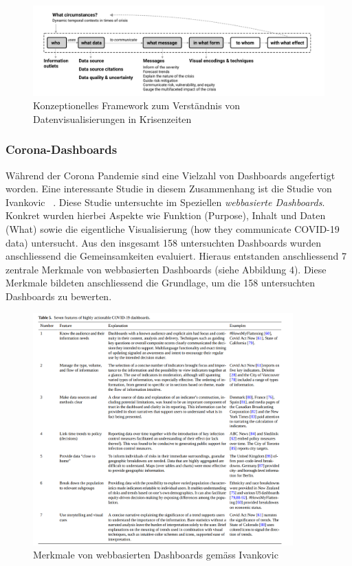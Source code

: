 \documentclass[12pt, oneside]{article}
\begin{document}
 \begin{figure}[ht]
    \includegraphics[width=12cm]{images/zhang_conceptual_framework.png}
    \centering
    \caption{Konzeptionelles Framework zum Verständnis von Datenvisualisierungen in Krisenzeiten ~\citep[S. 4]{YixuanZhang.}}
\end{figure}
 
\subsubsection{Corona-Dashboards}
Während der Corona Pandemie sind eine Vielzahl von Dashboards angefertigt worden. Eine interessante Studie in diesem Zusammenhang ist die Studie von Ivankovic ~\citep{Ivankovic.2021}. Diese Studie untersuchte im Speziellen \textit{webbasierte Dashboards}. Konkret wurden hierbei Aspekte wie Funktion (Purpose), Inhalt und Daten (What) sowie die eigentliche Visualisierung (how they communicate COVID-19 data) untersucht. Aus den insgesamt 158 untersuchten Dashboards wurden anschliessend die Gemeinsamkeiten evaluiert. Hieraus entstanden anschliessend 7 zentrale Merkmale von webbasierten Dashboards (siehe Abbildung 4). Diese Merkmale bildeten anschliessend die Grundlage, um die 158 untersuchten Dashboards zu bewerten.
\clearpage

 \begin{figure}[ht]
    \includegraphics[width=10cm]{images/ivankovic_dashboard_characteristics.png}
    \centering
    \caption{Merkmale von webbasierten Dashboards gemäss Ivankovic ~\citep[S. 12]{Ivankovic.2021}}
\end{figure}
\end{document}
